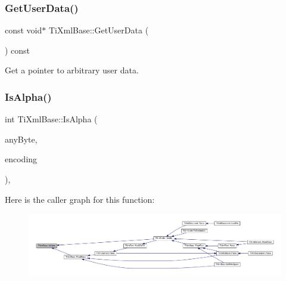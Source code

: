 \subsubsection{\texorpdfstring{Get\+User\+Data()}{GetUserData()}\hspace{0.1cm}{\footnotesize\ttfamily [2/2]}}
{\footnotesize\ttfamily const void$\ast$ Ti\+Xml\+Base\+::\+Get\+User\+Data (\begin{DoxyParamCaption}{ }\end{DoxyParamCaption}) const\hspace{0.3cm}{\ttfamily [inline]}}



Get a pointer to arbitrary user data. 

\mbox{\label{class_ti_xml_base_ae22522b2e8e1ac43102d16394f639fc8}} 
\subsubsection{\texorpdfstring{Is\+Alpha()}{IsAlpha()}}
{\footnotesize\ttfamily int Ti\+Xml\+Base\+::\+Is\+Alpha (\begin{DoxyParamCaption}\item[{unsigned char}]{any\+Byte,  }\item[{\hyperlink{tinyxml_8h_a88d51847a13ee0f4b4d320d03d2c4d96}{Ti\+Xml\+Encoding}}]{encoding }\end{DoxyParamCaption})\hspace{0.3cm}{\ttfamily [static]}, {\ttfamily [protected]}}

Here is the caller graph for this function\+:
\nopagebreak
\begin{figure}[H]
\begin{center}
\leavevmode
\includegraphics[width=350pt]{class_ti_xml_base_ae22522b2e8e1ac43102d16394f639fc8_icgraph}
\end{center}
\end{figure}
\mbox{\label{class_ti_xml_base_a321919055c115c78ded17f85a793f368}} 
